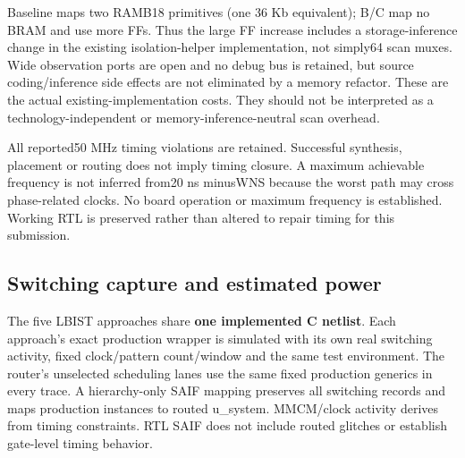 \documentclass[11pt,a4paper]{article}
\begin{document}
Baseline maps two RAMB18 primitives (one 36 Kb equivalent); B/C map no BRAM and use more FFs. Thus the large FF increase includes a storage-inference change in the existing isolation-helper implementation, not simply64 scan muxes. Wide observation ports are open and no debug bus is retained, but source coding/inference side effects are not eliminated by a memory refactor. These are the actual existing-implementation costs. They should not be interpreted as a technology-independent or memory-inference-neutral scan overhead.



\begin{center}\end{center}


All reported50 MHz timing violations are retained. Successful synthesis, placement or routing does not imply timing closure. A maximum achievable frequency is not inferred from20 ns minusWNS because the worst path may cross phase-related clocks. No board operation or maximum frequency is established. Working RTL is preserved rather than altered to repair timing for this submission.



\subsection{Switching capture and estimated power}


The five LBIST approaches share \textbf{one implemented C netlist}. Each approach's exact production wrapper is simulated with its own real switching activity, fixed clock/pattern count/window and the same test environment. The router's unselected scheduling lanes use the same fixed production generics in every trace. A hierarchy-only SAIF mapping preserves all switching records and maps production instances to routed u\_system. MMCM/clock activity derives from timing constraints. RTL SAIF does not include routed glitches or establish gate-level timing behavior.
\end{document}
